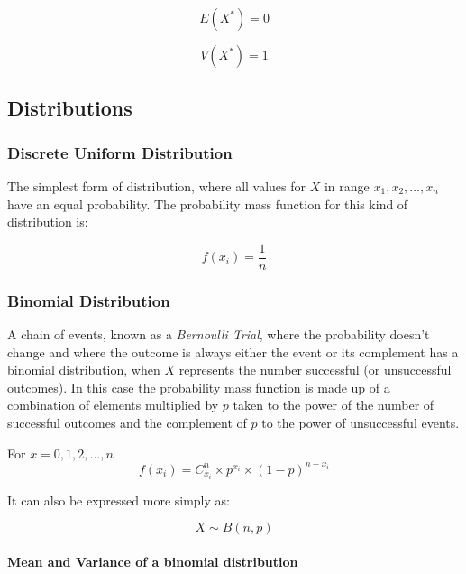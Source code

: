 \documentclass[a4paper, 10pt]{article}
\begin{document}
	\begin{equation*}
		E(X^*)= 0
	\end{equation*}

	\begin{equation*}
		V(X^*)= 1
	\end{equation*}

	\newpage
	\subsection{Distributions}

		\subsubsection{Discrete Uniform Distribution}

		The simplest form of distribution, where all values for \(X\) in range \(x_1, x_2,\ldots ,x_n\) have an equal probability. The probability mass function for this kind of distribution is:

		\begin{equation*}
		f(x_i)=\frac{1}{n}
		\end{equation*}

	\subsubsection{Binomial Distribution}

	A chain of events, known as a \emph{Bernoulli Trial}, where the probability doesn't change and where the outcome is always either the event or its complement has a binomial distribution, when \(X\) represents the number successful (or unsuccessful outcomes). In this case the probability mass function is made up of a combination of elements multiplied by \(p\) taken to the power of the number of successful outcomes and the complement of \(p\) to the power of unsuccessful events.
	\newline

	\noindent For \(x=0, 1, 2,\ldots ,n\)
	\begin{equation*}
	f(x_{i})=C^{n}_{x_{i}}\times p^{x_{i}}\times (1-p)^{n-x_{i}}
	\end{equation*}

	\noindent It can also be expressed more simply as:

	\begin{equation*}
	X\sim B(n, p)
	\end{equation*}

	\paragraph{Mean and Variance of a binomial distribution}
\end{document}
